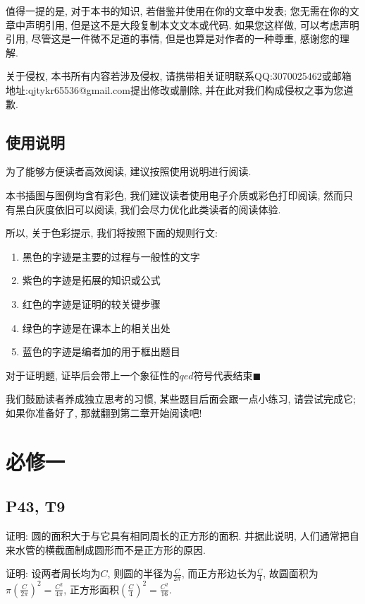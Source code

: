 \documentclass{book}
\begin{document}
    值得一提的是, 对于本书的知识, 若借鉴并使用在你的文章中发表; 您无需在你的文章中声明引用, 但是这不是大段复制本文文本或代码. 如果您这样做, 可以考虑声明引用, 尽管这是一件微不足道的事情, 但是也算是对作者的一种尊重, 感谢您的理解.

    关于侵权, 本书所有内容若涉及侵权, 请携带相关证明联系QQ:3070025462或邮箱地址:qjtykr65536@gmail.com提出修改或删除, 并在此对我们构成侵权之事为您道歉.
    \section{使用说明}

    为了能够方便读者高效阅读, 建议按照使用说明进行阅读.

    本书插图与图例均含有彩色, 我们建议读者使用电子介质或彩色打印阅读, 然而只有黑白灰度依旧可以阅读, 我们会尽力优化此类读者的阅读体验.

    所以, 关于色彩提示, 我们将按照下面的规则行文:

    \begin{enumerate}
        \item 黑色的字迹是主要的过程与一般性的文字
        \item \textcolor[rgb]{0.38,0.11,0.2}{紫色的字迹是拓展的知识或公式}
        \item \textcolor[rgb]{0.75,0.17,0.22}{红色的字迹是证明的较关键步骤}
        \item \textcolor[rgb]{0.11,0.65,0.52}{绿色的字迹是在课本上的相关出处}
        \item \textcolor[rgb]{0.13,0.47,0.72}{蓝色的字迹是编者加的用于框出题目}
    \end{enumerate}

    对于证明题, 证毕后会带上一个象征性的$qed$符号代表结束$\blacksquare$

    我们鼓励读者养成独立思考的习惯, 某些题目后面会跟一点小练习, 请尝试完成它; 如果你准备好了, 那就翻到第二章开始阅读吧!
    \chapter{必修一}
    \section{\textcolor[rgb]{0.11,0.65,0.52}{P43, T9}}
    \begin{boxB}
        证明: 圆的面积大于与它具有相同周长的正方形的面积. 并据此说明, 人们通常把自来水管的横截面制成圆形而不是正方形的原因.
    \end{boxB}
    \doublespacing
    证明: 设两者周长均为$C$, 则圆的半径为$\displaystyle \frac{C}{2\pi}$, 而正方形边长为$\displaystyle \frac{C}{4}$, 故圆面积为$\displaystyle \pi(\frac{C}{2\pi})^2=\frac{C^2}{4\pi}$, 正方形面积$\displaystyle (\frac{C}{4})^2=\frac{C^2}{16}$.
\end{document}
